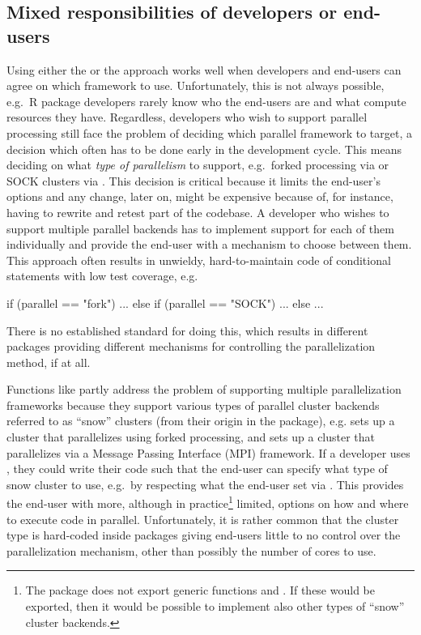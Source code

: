 \subsection{Mixed responsibilities of developers or end-users}
\label{mixed-responsibilities}

Using either the  or the  approach
works well when developers and end-users can agree on which framework
to use. Unfortunately, this is not always possible, e.g.\ R package
developers rarely know who the end-users are and what compute
resources they have. Regardless, developers who wish to support
parallel processing still face the problem of deciding which parallel
framework to target, a decision which often has to be done early in
the development cycle. This means deciding on what \emph{type of
parallelism} to support, e.g.\ forked processing via 
or SOCK clusters via . This decision is critical
because it limits the end-user's options and any change, later on,
might be expensive because of, for instance, having to rewrite and
retest part of the codebase. A developer who wishes to support
multiple parallel backends has to implement support for each of them
individually and provide the end-user with a mechanism to choose
between them. This approach often results in unwieldy,
hard-to-maintain code of conditional statements with low test
coverage, e.g.
\begin{example}
if (parallel == "fork") {
  ...
} else if (parallel == "SOCK") {
  ...
} else {
  ...
}
\end{example}
There is no established standard for doing this, which results in
different packages providing different mechanisms for controlling the
parallelization method, if at all.

Functions like  partly address the problem of
supporting multiple parallelization frameworks because they support
various types of parallel cluster backends referred to as ``snow''
clusters (from their origin in the  package), e.g.
 sets up a cluster that
parallelizes using forked processing, and
 sets up a cluster that
parallelizes via a Message Passing Interface (MPI) framework.  If a
developer uses , they could write their code such
that the end-user can specify what type of snow cluster to use, e.g.\
by respecting what the end-user set
via .  This provides the end-user
with more, although in practice\footnote{The \pkg{parallel} package
does not export generic functions \code{sendData()}
and . If these would be exported, then it would be
possible to implement also other types of ``snow'' cluster backends.}
limited, options on how and where to execute code in
parallel. Unfortunately, it is rather common that the cluster type is
hard-coded inside packages giving end-users little to no control over
the parallelization mechanism, other than possibly the number of cores
to use.

